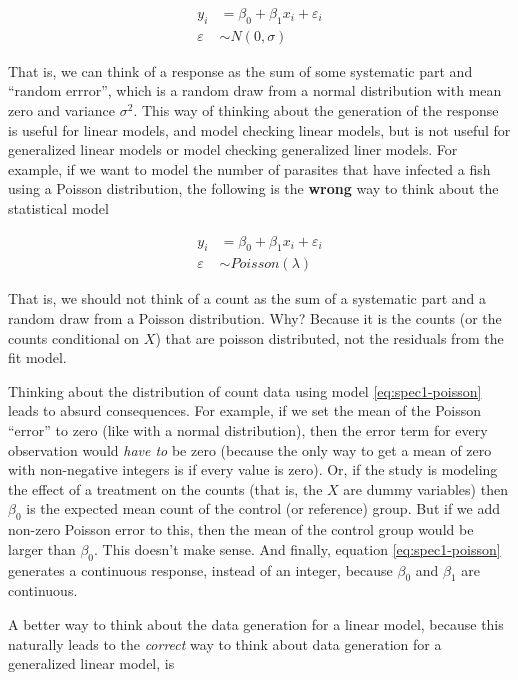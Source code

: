 \documentclass[]{book}
\begin{document}
\begin{align}
y_i &= \beta_0 + \beta_1 x_i + \varepsilon_i \\
\varepsilon &\sim N(0, \sigma)
\label{eq:spec1}
\end{align}

That is, we can think of a response as the sum of some systematic part and ``random errror'', which is a random draw from a normal distribution with mean zero and variance \(\sigma^2\). This way of thinking about the generation of the response is useful for linear models, and model checking linear models, but is not useful for generalized linear models or model checking generalized liner models. For example, if we want to model the number of parasites that have infected a fish using a Poisson distribution, the following is the \textbf{wrong} way to think about the statistical model

\begin{align}
y_i &= \beta_0 + \beta_1 x_i + \varepsilon_i\\
\varepsilon &\sim Poisson(\lambda)
\label{eq:spec1-poisson}
\end{align}

That is, we should not think of a count as the sum of a systematic part and a random draw from a Poisson distribution. Why? Because it is the counts (or the counts conditional on \(X\)) that are poisson distributed, not the residuals from the fit model.

Thinking about the distribution of count data using model \eqref{eq:spec1-poisson} leads to absurd consequences. For example, if we set the mean of the Poisson ``error'' to zero (like with a normal distribution), then the error term for every observation would \emph{have to} be zero (because the only way to get a mean of zero with non-negative integers is if every value is zero). Or, if the study is modeling the effect of a treatment on the counts (that is, the \(X\) are dummy variables) then \(\beta_0\) is the expected mean count of the control (or reference) group. But if we add non-zero Poisson error to this, then the mean of the control group would be larger than \(\beta_0\). This doesn't make sense. And finally, equation \eqref{eq:spec1-poisson} generates a continuous response, instead of an integer, because \(\beta_0\) and \(\beta_1\) are continuous.

A better way to think about the data generation for a linear model, because this naturally leads to the \emph{correct} way to think about data generation for a generalized linear model, is
\end{document}
